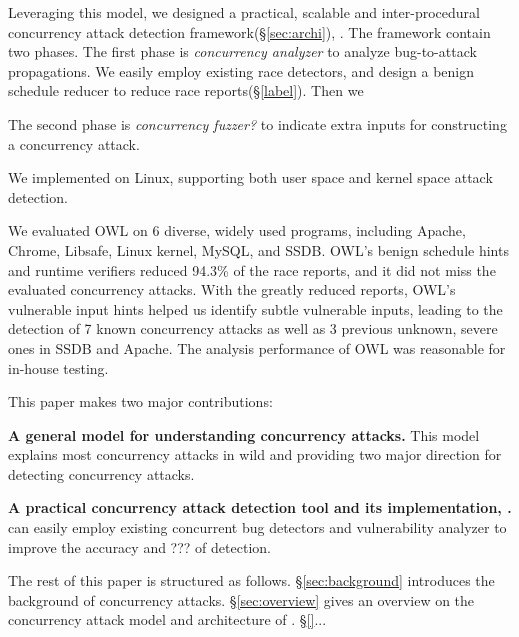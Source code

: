 Leveraging this model, we designed a practical, scalable and inter-procedural concurrency 
attack detection framework(\S\ref{sec:archi}), \xxx. 
The framework contain two phases.
The first phase is \emph{concurrency analyzer} to analyze bug-to-attack propagations. 
We easily employ existing race detectors, and design a benign schedule reducer to reduce race reports(\S\ref{label}). 
Then we 

The second phase is \emph{concurrency fuzzer?} to indicate extra inputs for constructing a concurrency attack. 


We implemented \xxx on Linux, supporting both user space and kernel space attack detection. 



We evaluated OWL on 6 diverse, widely used programs, including Apache, Chrome, Libsafe, Linux kernel, MySQL,
and SSDB. OWL’s benign schedule hints and runtime verifiers reduced 94.3\% of the race reports, 
and it did not miss the evaluated concurrency attacks. With the greatly reduced reports,
OWL’s vulnerable input hints helped us identify subtle
vulnerable inputs, leading to the detection of 7 known concurrency
attacks as well as 3 previous unknown, severe ones
in SSDB and Apache. The analysis performance of OWL was
reasonable for in-house testing.


This paper makes two major contributions:

\begin{tightenum}
\item \textbf{A general model for understanding concurrency attacks.} 
This model explains most concurrency attacks in wild and 
providing two major direction for detecting concurrency attacks. 
	
\item \textbf{A practical concurrency attack detection tool and its implementation, \xxx.} 
\xxx can easily employ existing concurrent bug detectors and vulnerability analyzer 
to improve the accuracy and ??? of detection.
	
\end{tightenum}

 

The rest of this paper is structured as follows. 
\S\ref{sec:background} introduces the background of concurrency attacks.
\S\ref{sec:overview} gives an overview on the concurrency attack model and architecture of \xxx.
\S\ref{}...





